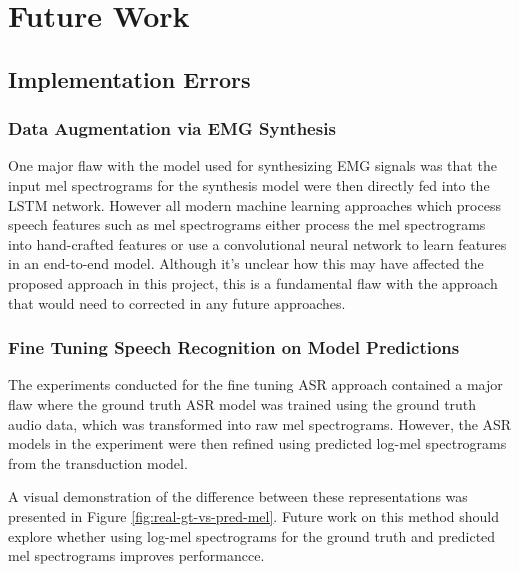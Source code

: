 \chapter{Future Work} \label{chap:future-work}

\section{Implementation Errors}

\subsection{Data Augmentation via EMG Synthesis}

One major flaw with the model used for synthesizing EMG signals
was that the input mel spectrograms for the synthesis model were
then directly fed into the LSTM network. However all modern
machine learning approaches which process speech features such as
mel spectrograms either process the mel spectrograms into hand-crafted
features or use a convolutional neural network to learn features
in an end-to-end model. Although it's unclear how this may have affected
the proposed approach in this project, this is a fundamental flaw with
the approach that would need to corrected in any future approaches.

\subsection{Fine Tuning Speech Recognition on Model Predictions}

The experiments conducted for the fine tuning ASR approach contained
a major flaw where the ground truth ASR model was trained using
the ground truth audio data, which was transformed into raw mel spectrograms.
However, the ASR models in the experiment were then
refined using predicted log-mel spectrograms from the transduction model.

A visual demonstration of the difference between these representations
was presented in Figure \ref{fig:real-gt-vs-pred-mel}. Future work
on this method should explore whether using log-mel spectrograms for
the ground truth and predicted mel spectrograms improves performancce.